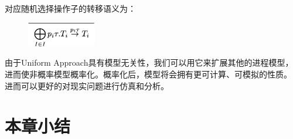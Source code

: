    对应随机选择操作子的转移语义为：
   \begin{figure}[!htbp]
    \small
    \centering
    \includegraphics[width=3cm]{../figure/rccs.png}
    \caption[]{}
     \label{fig_rccs}
 \end{figure}

   由于Uniform Approach具有模型无关性，我们可以用它来扩展其他的进程模型，
   进而使非概率模型概率化。概率化后，模型将会拥有更可计算、可模拟的性质。
   进而可以更好的对现实问题进行仿真和分析。

\section{本章小结}
